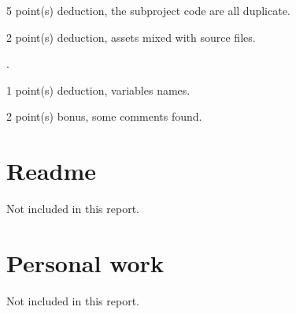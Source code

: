 \documentclass{article}
\begin{document}
5 point(s) {\color{red}deduction}, the subproject code are all duplicate.\medskip

2 point(s) {\color{red}deduction}, assets mixed with source files.\medskip

.\medskip

1 point(s) {\color{red}deduction}, variables names.\medskip

2 point(s) {\color{red}bonus}, some comments found.\medskip



\newpage

\section{Readme}

Not included in this report.

\section{Personal work}

Not included in this report.


\newpage
\end{document}

